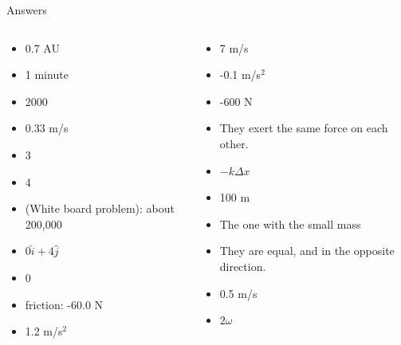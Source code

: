 \documentclass{beamer}
\begin{document}
\begin{frame}{Answers}
\small
\begin{columns}[T]
\begin{column}{0.5\textwidth}
\begin{itemize}
\item 0.7 AU
\item 1 minute
\item 2000
\item 0.33 m/s
\item 3
\item 4
\item (White board problem): about 200,000
\item $0\hat{i}+4\hat{j}$
\item 0
\item friction: -60.0 N
\item 1.2 m/s$^2$
\end{itemize}
\end{column}
\begin{column}{0.5\textwidth}
\begin{itemize}
\item 7 m/s
\item -0.1 m/s$^2$
\item -600 N
\item They exert the same force on each other.
\item $-k \Delta x$
\item 100 m
\item The one with the small mass
\item They are equal, and in the opposite direction.
\item 0.5 m/s
\item $2\omega$
\end{itemize}
\end{column}
\end{columns}
\end{frame}
\end{document}
